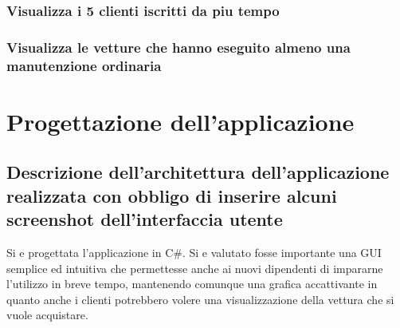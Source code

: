\documentclass[12pt]{article}
\begin{document}
\subsubsection*{Visualizza i 5 clienti iscritti da piu tempo}

\subsubsection*{Visualizza le vetture che hanno eseguito almeno una
manutenzione ordinaria}

\section{Progettazione dell'applicazione}

\subsection{Descrizione dell'architettura dell'applicazione
realizzata con obbligo di inserire alcuni screenshot dell'interfaccia utente}

Si e progettata l'applicazione in C\#. Si e valutato fosse importante una GUI
semplice ed intuitiva che permettesse anche ai nuovi dipendenti di impararne
l'utilizzo in breve tempo, mantenendo comunque una grafica accattivante in
quanto anche i clienti potrebbero volere una visualizzazione della vettura che
si vuole acquistare.
\end{document}
